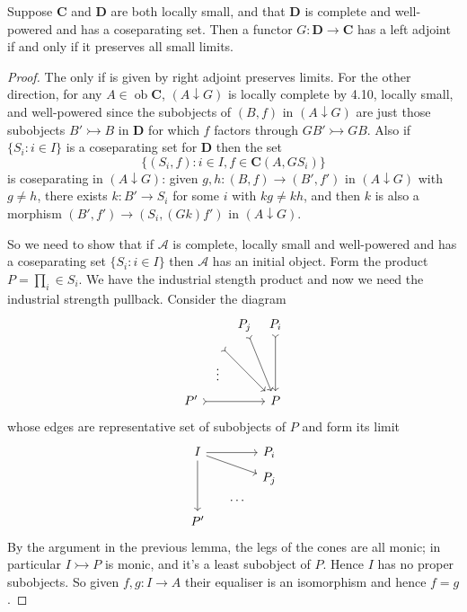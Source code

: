 \documentclass[a4paper]{article}
\renewcommand{\c}[1]{\mathbf{#1}}
\DeclareMathOperator{\ob}{ob}
\newcommand{\mono}{\rightarrowtail}
\begin{document}
\begin{theorem}
  Suppose \(\c C\) and \(\c D\) are both locally small, and that \(\c D\) is complete and well-powered and has a coseparating set. Then a functor \(G: \c D \to \c C\) has a left adjoint if and only if it preserves all small limits.
\end{theorem}

\begin{proof}
  The only if is given by right adjoint preserves limits. For the other direction, for any \(A \in \ob \c C\), \((A \downarrow G)\) is locally complete by 4.10, locally small, and well-powered since the subobjects of \((B, f)\) in \((A \downarrow G)\) are just those subobjects \(B' \mono B\) in \(\c D\) for which \(f\) factors through \(GB' \mono GB\). Also if \(\{S_i: i \in I\}\) is a coseparating set for \(\c D\) then the set
  \[
    \{(S_i, f): i \in I, f \in \c C(A, GS_i)\}
  \]
  is coseparating in \((A \downarrow G)\): given \(g, h: (B, f) \to (B', f')\) in \((A \downarrow G)\) with \(g \neq h\), there exists \(k: B' \to S_i\) for some \(i\) with \(kg \neq kh\), and then \(k\) is also a morphism \((B', f') \to (S_i, (Gk) f')\) in \((A \downarrow G)\).

  So we need to show that if \(\mathcal A\) is complete, locally small and well-powered and has a coseparating set \(\{S_i: i \in I\}\) then \(\mathcal A\) has an initial object. Form the product \(P = \prod_i \in S_i\). We have the industrial stength product and now we need the industrial strength pullback. Consider the diagram
  \[
    \begin{tikzcd}[row sep=tiny, column sep=tiny]
      & & P_j \ar[dddr, rightarrowtail] & P_i \ar[ddd, rightarrowtail] \\
      & \ar[ddrr, rightarrowtail] \\
      & \vdots \\
      P' \ar[rrr, rightarrowtail] & & & P
    \end{tikzcd}
  \]
  whose edges are representative set of subobjects of \(P\) and form its limit
  \[
    \begin{tikzcd}[row sep=tiny, column sep=tiny]
      I \ar[rrr] \ar[rrrd] \ar[ddd] & & & P_i \\
      & & & P_j \\
      & & \dots \\
      P'
    \end{tikzcd}
  \]
  By the argument in the previous lemma, the legs of the cones are all monic; in particular \(I \mono P\) is monic, and it's a least subobject of \(P\). Hence \(I\) has no proper subobjects. So given \(f, g: I \to A\) their equaliser is an isomorphism and hence \(f = g\).


\end{proof}
\end{document}
